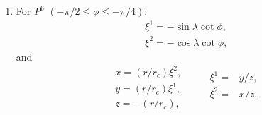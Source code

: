 \documentclass{report}
\begin{document}
\begin{enumerate}
\item For $P^6$ $\left(-\pi/2 \leq \phi \leq -\pi/4 \right)$:
\begin{equation} \label{eq:P6-sphere-to-cube}
    \begin{array}{l}
        \xi^1 = - \sin \lambda \cot \phi ,\\
        \xi^2 = -\cos \lambda \cot \phi ,
    \end{array}
\end{equation}
and
\begin{equation}\label{eq:P6-cube-to-global-and-vice-versa}
    \begin{array}{l}
        x = (r/r_c) \xi^2,  \\
        y = (r/r_c)\xi^1,\\
        z = -(r/r_c),
    \end{array}
    \qquad
    \begin{array}{l}
        \xi^1 = -{y}/{z}, \\
        \xi^2 = -{x}/{z}. \\
    \end{array}
\end{equation}
\end{enumerate}
\end{document}
